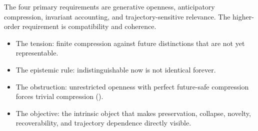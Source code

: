 
The four primary requirements are generative openness, anticipatory
compression, invariant accounting, and trajectory-sensitive relevance.
The higher-order requirement is compatibility and coherence.
\begin{itemize}
  \item The tension: finite compression against future
    distinctions that are not yet representable.
  \item The epistemic rule: indistinguishable now is not
    identical forever.
  \item The obstruction: unrestricted openness with perfect
    future-safe compression forces trivial compression
    ().
  \item The objective: the intrinsic object that makes
    preservation, collapse, novelty, recoverability, and trajectory
    dependence directly visible.
\end{itemize}
